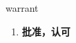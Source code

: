 
\begin{frame}
{\huge warrant}
\begin{center}
\begin{enumerate}\Large
  \item \textbf{批准，认可}
\end{enumerate}
\end{center}
\end{frame}
